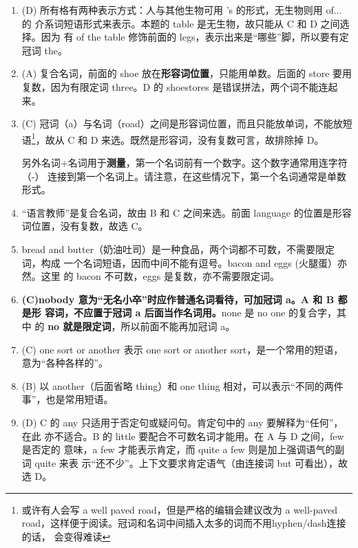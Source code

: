 \documentclass{yufa}
\begin{document}
\begin{enumerate}


\item (D) 所有格有两种表示方式：人与其他生物可用 's 的形式，无生物则用 of... 的
  介系词短语形式来表示。本题的 table 是无生物，故只能从 C 和 D 之间选择。因为
  有 of the table 修饰前面的 legs，表示出来是“哪些”脚，所以要有定冠词 the。

\item (A) 复合名词，前面的 shoe 放在\textbf{形容词位置}，只能用单数。后面的 store 要用
  复数，因为有限定词 three。D 的 shoestores 是错误拼法，两个词不能连起来。

\item (C) 冠词（a）与名词（road）之间是形容词位置，而且只能放单词，不能放短
  语\footnote{或许有人会写 a well paved road，但是严格的编辑会建议改为 a well-paved
    road，这样便于阅读。冠词和名词中间插入太多的词而不用hyphen/dash连接的话，
    会变得难读}，故从 C 和 D 来选。既然是形容词，没有复数可言，故排除掉 D。

  另外名词+名词用于\textbf{测量}，第一个名词前有一个数字。这个数字通常用连字符（-）
  连接到第一个名词上。请注意，在这些情况下，第一个名词通常是单数形式。

\item “语言教师”是复合名词，故由 B 和
  C 之间来选。前面 language 的位置是形容词位置，没有复数，故选 C。

\item bread and butter（奶油吐司）是一种食品，两个词都不可数，不需要限定词，构成
  一个名词短语，因而中间不能有逗号。bacon and eggs (火腿蛋）亦然。这里
  的 bacon 不可数，eggs 是复数，亦不需要限定词。

\item \textbf{(C)nobody 意为“无名小卒”时应作普通名词看待，可加冠词 a。A 和 B 都是形
    容词，不应置于冠词 a 后面当作名词用。}none 是 no one 的复合字，其中
  的 \textbf{no 就是限定词}，所以前面不能再加冠词 a。

\item (C) one sort or another 表示 one sort or another sort，是一个常用的短语，
  意为“各种各样的”。

\item (B) 以 another（后面省略 thing）和 one thing 相对，可以表示“不同的两件
  事”，也是常用短语。

\item (D) C 的 any 只适用于否定句或疑问句。肯定句中的 any 要解释为“任何”，在此
  亦不适合。B 的 little 要配合不可数名词才能用。在 A 与 D 之间，few 是否定的
  意味，a few 才能表示肯定，而 quite a few 则是加上强调语气的副词 quite 来表
  示“还不少”。上下文要求肯定语气（由连接词 but 可看出），故选 D。


\end{enumerate}
\end{document}
